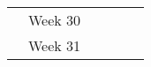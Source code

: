 \documentclass[
  a4paper,  %
  twoside,  %
  bibliography=totoc,
  headsepline,
  cleardoublepage=empty,
  parskip=half,
  draft=false
]{scrbook}
\begin{document}
\begin{table}[]
\begin{tabular}{clllcc}
\multicolumn{1}{l}{}            & Week 30      &                   &                   & \multicolumn{1}{l}{}                                                                     & \multicolumn{1}{l}{}                                                                                                       \\
\multicolumn{1}{l}{}            & Week 31      &                   &                   & \multicolumn{1}{l}{}                                                                     & \multicolumn{1}{l}{}                                                                                                      
\end{tabular}
\end{table}



%

\pagestyle{empty}
\renewcommand*{\chapterpagestyle}{empty}
\Versicherung
\end{document}
